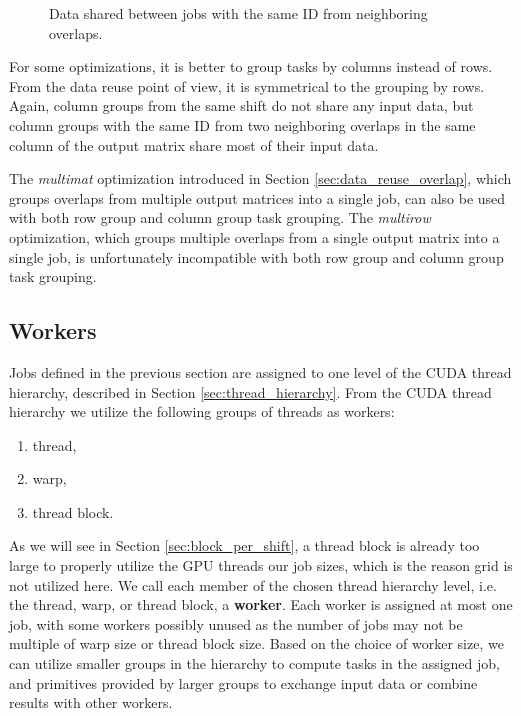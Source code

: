 \begin{figure}[ht]
	\centering
	\def\svgwidth{0.5\textwidth}
	\fontsize{8}{10}\selectfont
	
	\caption{Data shared between jobs with the same ID from neighboring overlaps.}
	\label{fig:row_subset_data_reuse}
\end{figure}

For some optimizations, it is better to group tasks by columns instead of rows. From the data reuse point of view, it is symmetrical to the grouping by rows. Again, column groups from the same shift do not share any input data, but column groups with the same ID from two neighboring overlaps in the same column of the output matrix share most of their input data.

The \textit{multimat} optimization introduced in Section \ref{sec:data_reuse_overlap}, which groups overlaps from multiple output matrices into a single job, can also be used with both row group and column group task grouping. The \textit{multirow} optimization, which groups multiple overlaps from a single output matrix into a single job, is unfortunately incompatible with both row group and column group task grouping.

\subsection{Workers}

Jobs defined in the previous section are assigned to one level of the CUDA thread hierarchy, described in Section \ref{sec:thread_hierarchy}. From the CUDA thread hierarchy we utilize the following groups of threads as workers:
\begin{enumerate}
	\item thread,
	\item warp,
	\item thread block.
\end{enumerate}

As we will see in Section \ref{sec:block_per_shift}, a thread block is already too large to properly utilize the GPU threads our job sizes, which is the reason grid is not utilized here.
We call each member of the chosen thread hierarchy level, i.e. the thread, warp, or thread block, a \textbf{worker}. Each worker is assigned at most one job, with some workers possibly unused as the number of jobs may not be multiple of warp size or thread block size. Based on the choice of worker size, we can utilize smaller groups in the hierarchy to compute tasks in the assigned job, and primitives provided by larger groups to exchange input data or combine results with other workers.

